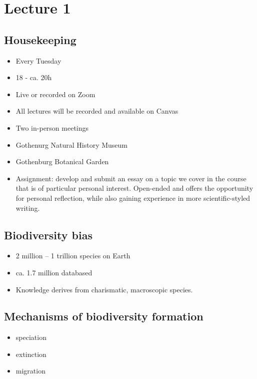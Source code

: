 \section{Lecture 1}

\subsection{Housekeeping}

\begin{itemize}
	\item Every Tuesday
	\item 18 - ca. 20h
	\item Live or recorded on Zoom
	\item All lectures will be recorded and available on Canvas
	\item Two in-person meetings
	\item Gothenurg Natural History Museum
	\item Gothenburg Botanical Garden
	\item Assignment: develop and submit an essay on a topic we cover in
		the course that is of particular personal interest. Open-ended
		and offers the opportunity for personal reflection, while also
		gaining experience in more scientific-styled writing.
\end{itemize}

\subsection{Biodiversity bias}

\begin{itemize}
	\item 2 million -- 1 trillion species on Earth
	\item ca. 1.7 million databased
	\item Knowledge derives from charismatic, macroscopic species.
\end{itemize}

\subsection{Mechanisms of biodiversity formation}

\begin{itemize}
	\item speciation
	\item extinction
	\item migration
\end{itemize}


